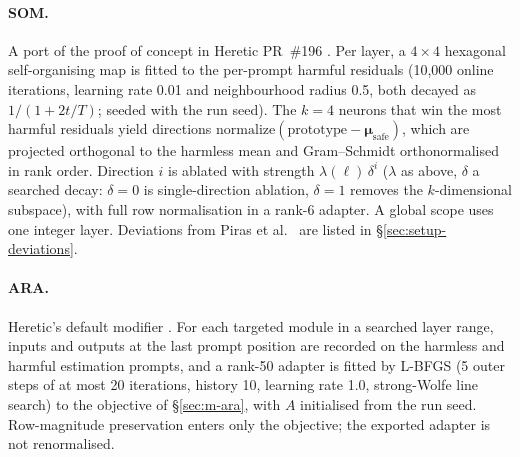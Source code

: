 \paragraph{SOM.} A port of the proof of concept in Heretic PR~\#196
\cite{piras2025som}. Per layer, a $4\times4$ hexagonal self-organising map is
fitted to the per-prompt harmful residuals (10{,}000 online iterations,
learning rate 0.01 and neighbourhood radius 0.5, both decayed as
$1/(1+2t/T)$; seeded with the run seed). The $k=4$ neurons that win the most
harmful residuals yield directions
$\mathrm{normalize}(\text{prototype}-\boldsymbol{\mu}_{\mathrm{safe}})$, which
are projected orthogonal to the harmless mean and Gram--Schmidt orthonormalised
in rank order. Direction $i$ is ablated with strength $\lambda(\ell)\,\delta^{i}$
($\lambda$ as above, $\delta$ a searched decay: $\delta=0$ is single-direction
ablation, $\delta=1$ removes the $k$-dimensional subspace), with full row
normalisation in a rank-6 adapter. A global scope uses one integer layer.
Deviations from Piras et al.~\cite{piras2025som} are listed in
\S\ref{sec:setup-deviations}.

\paragraph{ARA.} Heretic's default modifier \cite{weidmann2026ara}. For each
targeted module in a searched layer range, inputs and outputs at the last
prompt position are recorded on the harmless and harmful estimation prompts,
and a rank-50 adapter is fitted by L-BFGS (5 outer steps of at most 20
iterations, history 10, learning rate 1.0, strong-Wolfe line search) to the
objective of \S\ref{sec:m-ara}, with $A$ initialised from the run seed.
Row-magnitude preservation enters only the objective; the exported adapter is
not renormalised.

